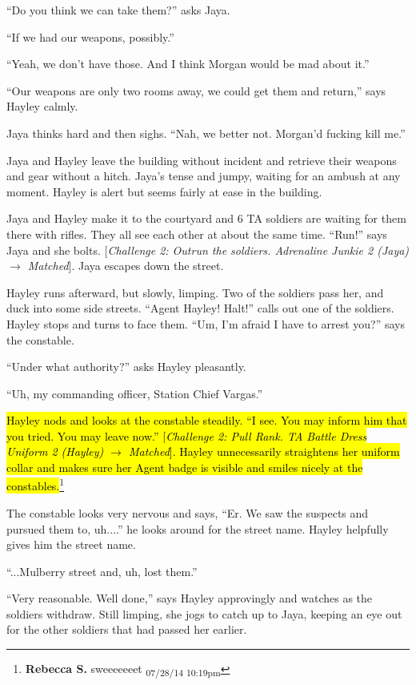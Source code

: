 ``Do you think we can take them?'' asks Jaya.

``If we had our weapons, possibly.''

``Yeah, we don't have those.  And I think Morgan would be mad about it.''

``Our weapons are only two rooms away, we could get them and return,'' says Hayley calmly.

Jaya thinks hard and then sighs.  ``Nah, we better not.  Morgan'd fucking kill me.''

Jaya and Hayley leave the building without incident and retrieve their weapons and gear without a hitch.  Jaya's tense and jumpy, waiting for an ambush at any moment.  Hayley is alert but seems fairly at ease in the building.



Jaya and Hayley make it to the courtyard and 6 TA soldiers are waiting for them there with rifles.  They all see each other at about the same time.  ``Run!'' says Jaya and she bolts.  {[}\textit{Challenge 2: Outrun the soldiers.  Adrenaline Junkie 2 (Jaya) $\rightarrow$ Matched}{]}.  Jaya escapes down the street.



Hayley runs afterward, but slowly, limping.  Two of the soldiers pass her, and duck into some side streets.  ``Agent Hayley!  Halt!'' calls out one of the soldiers.  Hayley stops and turns to face them. ``Um, I'm afraid I have to arrest you?'' says the constable.

``Under what authority?'' asks Hayley pleasantly.

``Uh, my commanding officer, Station Chief Vargas.''

\hl{Hayley nods and looks at the constable steadily.  ``I see.  You may inform him that you tried.  You may leave now.'' {[}\textit{Challenge 2: Pull Rank.   TA Battle Dress Uniform 2 (Hayley) $\rightarrow$ Matched}{]}.  Hayley unnecessarily straightens her uniform collar and makes sure her Agent badge is visible and smiles nicely at the constables.}\footnote{\textbf{Rebecca S. }sweeeeeeet \textsubscript{07/28/14 10:19pm}}

The constable looks very nervous and says, ``Er.  We saw the suspects and pursued them to, uh....'' he looks around for the street name.  Hayley helpfully gives him the street name.

``...Mulberry street and, uh, lost them.''

``Very reasonable.  Well done,'' says Hayley approvingly and watches as the soldiers withdraw.  Still limping, she jogs to catch up to Jaya, keeping an eye out for the other soldiers that had passed her earlier.

